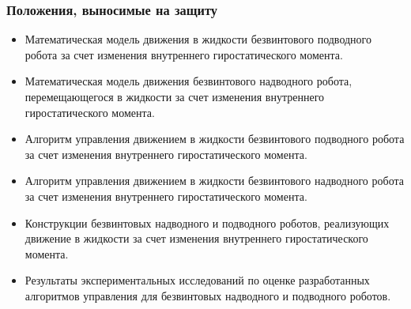 \begin{frame}
    \frametitle{Положения, выносимые на защиту}
    \begin{itemize}
        \item Математическая модель движения в жидкости безвинтового подводного робота за счет изменения внутреннего гиростатического момента.
        \item Математическая модель движения безвинтового надводного робота, перемещающегося в жидкости за счет изменения внутреннего гиростатического момента. %
        \item Алгоритм управления движением в жидкости безвинтового подводного робота за счет изменения внутреннего гиростатического момента.
        \item Алгоритм управления движением в жидкости безвинтового надводного робота за счет изменения внутреннего гиростатического момента.
        \item Конструкции безвинтовых надводного и подводного роботов, реализующих движение в жидкости за счет изменения внутреннего гиростатического момента.
        \item Результаты экспериментальных исследований по оценке разработанных алгоритмов управления для безвинтовых надводного и подводного роботов.        
    \end{itemize}
\end{frame}
%
%
%
%
%
